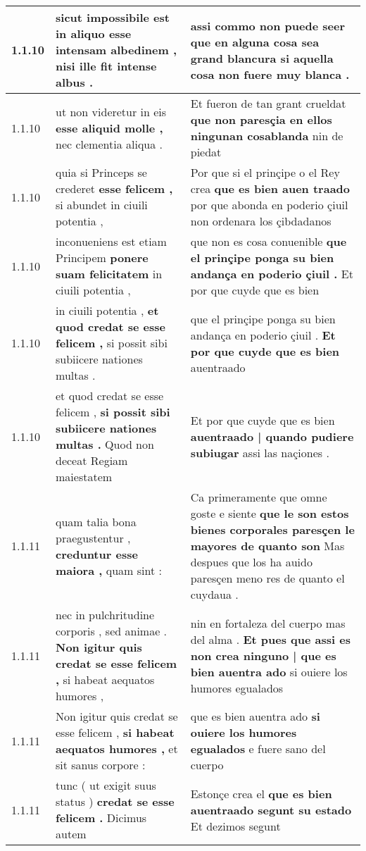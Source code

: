 \begin{tabular}{|p{1cm}|p{6.5cm}|p{6.5cm}|}
1.1.10 & sicut impossibile est in aliquo \textbf{ esse intensam albedinem , } nisi ille fit intense albus . & assi commo non puede seer \textbf{ que en alguna cosa sea grand blancura } si aquella cosa non fuere muy blanca . \\\hline
1.1.10 & ut non videretur in eis \textbf{ esse aliquid molle , } nec clementia aliqua . & Et fueron de tan grant crueldat \textbf{ que non paresçia en ellos ningunan cosablanda } nin de piedat \\\hline
1.1.10 & quia si Princeps se crederet \textbf{ esse felicem , } si abundet in ciuili potentia , & Por que si el prinçipe o el Rey crea \textbf{ que es bien auen traado } por que abonda en poderio çiuil non ordenara los çibdadanos \\\hline
1.1.10 & inconueniens est etiam Principem \textbf{ ponere suam felicitatem } in ciuili potentia , & que non es cosa conuenible \textbf{ que el prinçipe ponga su bien andança en poderio çiuil . } Et por que cuyde que es bien \\\hline
1.1.10 & in ciuili potentia , \textbf{ et quod credat se esse felicem , } si possit sibi subiicere nationes multas . & que el prinçipe ponga su bien andança en poderio çiuil . \textbf{ Et por que cuyde que es bien } auentraado \\\hline
1.1.10 & et quod credat se esse felicem , \textbf{ si possit sibi subiicere nationes multas . } Quod non deceat Regiam maiestatem & Et por que cuyde que es bien \textbf{ auentraado | quando pudiere subiugar } assi las naçiones . \\\hline
1.1.11 & quam talia bona praegustentur , \textbf{ creduntur esse maiora , } quam sint : & Ca primeramente que omne goste e siente \textbf{ que le son estos bienes corporales paresçen le mayores de quanto son } Mas despues que los ha auido paresçen meno res de quanto el cuydaua . \\\hline
1.1.11 & nec in pulchritudine corporis , sed animae . \textbf{ Non igitur quis credat se esse felicem , } si habeat aequatos humores , & nin en fortaleza del cuerpo mas del alma . \textbf{ Et pues que assi es non crea ninguno | que es bien auentra ado } si ouiere los humores egualados \\\hline
1.1.11 & Non igitur quis credat se esse felicem , \textbf{ si habeat aequatos humores , } et sit sanus corpore : & que es bien auentra ado \textbf{ si ouiere los humores egualados } e fuere sano del cuerpo \\\hline
1.1.11 & tunc ( ut exigit suus status ) \textbf{ credat se esse felicem . } Dicimus autem & Estonçe crea el \textbf{ que es bien auentraado segunt su estado } Et dezimos segunt \\\hline

\end{tabular}
